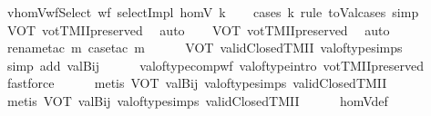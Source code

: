 \begin{isabellebody}
\ vhomVwfSelect{\isacharcolon}{\kern0pt}\ {\isachardoublequoteopen}wf\ {\isacharparenleft}{\kern0pt}selectImpl\ homV\ k{\isacharparenright}{\kern0pt}{\isachardoublequoteclose}\isanewline
%
\isadelimproof
\ \ %
\endisadelimproof
%
\isatagproof
{}\isamarkupfalse%
\ {\isacharparenleft}{\kern0pt}cases\ k\ rule{\isacharcolon}{\kern0pt}\ toVal{}{}{}{}{\isachardot}{\kern0pt}cases{\isacharsemicolon}{\kern0pt}\ simp{\isacharparenright}{\kern0pt}\isanewline
\ \ \isamarkupfalse%
\ VOT\ votTMIIpreserved\ \isamarkupfalse%
\ auto{\isacharbrackleft}{\kern0pt}{}{\isacharbrackright}{\kern0pt}\isanewline
\ \ \isamarkupfalse%
\ VOT\ votTMIIpreserved\ \isamarkupfalse%
\ auto{\isacharbrackleft}{\kern0pt}{}{\isacharbrackright}{\kern0pt}\isanewline
\ \ \ \ \isamarkupfalse%
\ {\isacharparenleft}{\kern0pt}rename{\isacharunderscore}{\kern0pt}tac\ m{\isacharcomma}{\kern0pt}\ case{\isacharunderscore}{\kern0pt}tac\ m{\isacharparenright}{\kern0pt}\isanewline
\ \ \ \ \isamarkupfalse%
\ VOT\ validClosedTMII\ val{\isacharunderscore}{\kern0pt}of{\isacharunderscore}{\kern0pt}type{\isachardot}{\kern0pt}simps\isanewline
\ \ \ \ \isamarkupfalse%
\ {\isacharparenleft}{\kern0pt}simp\ add{\isacharcolon}{\kern0pt}\ valBij{}{\isacharparenright}{\kern0pt}\isanewline
\ \ \ \ \isamarkupfalse%
\ valoftype{\isachardot}{\kern0pt}compwf\ valoftype{\isachardot}{\kern0pt}intro\ votTMIIpreserved\ \isamarkupfalse%
\ fastforce\isanewline
\ \ \ \ \isamarkupfalse%
\ {\isacharparenleft}{\kern0pt}metis\ VOT\ valBij{}\ val{\isacharunderscore}{\kern0pt}of{\isacharunderscore}{\kern0pt}type{\isachardot}{\kern0pt}simps\ validClosedTMII{\isacharparenright}{\kern0pt}\isanewline
\ \ \ \ \isamarkupfalse%
\ {\isacharparenleft}{\kern0pt}metis\ VOT\ valBij{}\ val{\isacharunderscore}{\kern0pt}of{\isacharunderscore}{\kern0pt}type{\isachardot}{\kern0pt}simps\ validClosedTMII{\isacharparenright}{\kern0pt}\isanewline
\ \ \ \ \isamarkupfalse%
%
\endisatagproof
{\isafoldproof}%
%
\isadelimproof
\isanewline
%
\endisadelimproof
\isanewline
{}\isamarkupfalse%
\ homVdef{\isacharcolon}{\kern0pt}\isanewline

\end{isabellebody}
